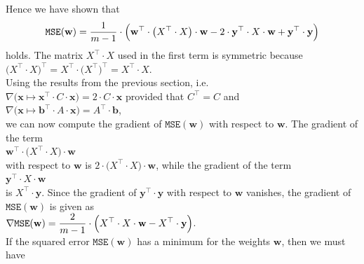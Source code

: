 Hence we have shown that
\begin{equation}
  \label{eq:squared-error-4}
  \mathtt{MSE}(\mathbf{w}) = \displaystyle \frac{1}{m-1} \cdot \Bigl(\mathbf{w}^\top \cdot \bigl(X^\top \cdot X\bigr) \cdot \mathbf{w} 
                                             - 2 \cdot \textbf{y}^\top \cdot X \cdot \mathbf{w} 
                                             + \mathbf{y}^\top \cdot \mathbf{y}
                                        \Bigr)
\end{equation}
holds.  The matrix $X^\top \cdot X$ used in the first term is symmetric because
\\[0.2cm]
\hspace*{1.3cm}
$\bigl(X^\top \cdot X\bigr)^\top = X^\top \cdot \bigl(X^\top\bigr)^\top = X^\top \cdot X$.
\\[0.2cm]
Using the results from the previous section, i.e.~
\\[0.2cm]
\hspace*{1.3cm}
$\nabla \bigl(\mathbf{x} \mapsto \mathbf{x}^\top \cdot C \cdot \mathbf{x}\bigr) = 2 \cdot C \cdot \mathbf{x}$
\quad provided that $C^\top = C$ \quad and
\\[0.2cm]
\hspace*{1.3cm}
$\nabla \bigl(\mathbf{x} \mapsto \mathbf{b}^\top \cdot A \cdot \mathbf{x}\bigr) = A^\top \cdot \mathbf{b}$,
\\[0.2cm]
we can now compute the gradient of $\mathtt{MSE}(\mathbf{w})$ with respect to
$\mathbf{w}$.  The gradient of the term
\\[0.2cm]
\hspace*{1.3cm}
$\mathbf{w}^\top \cdot \bigl(X^\top \cdot X\bigr) \cdot \mathbf{w}$
\\[0.2cm]
with respect to $\mathbf{w}$ is $2 \cdot \bigl(X^\top \cdot X\bigr) \cdot \mathbf{w}$, while the gradient of
the term 
\\[0.2cm]
\hspace*{1.3cm}
$\textbf{y}^\top \cdot X \cdot \mathbf{w}$
\\[0.2cm]
is $X^\top \cdot \mathbf{y}$.  Since the gradient of $\mathbf{y}^\top \cdot \mathbf{y}$ with respect to
$\mathbf{w}$ vanishes, the gradient of $\mathtt{MSE}(\mathbf{w})$ is given as
\\[0.2cm]
\hspace*{1.3cm}
$\displaystyle \nabla \mathtt{MSE}(\mathbf{w}) = \frac{2}{m-1} \cdot \Bigl(X^\top \cdot X \cdot \mathbf{w} - X^\top \cdot \mathbf{y}\Bigr)$.
\\[0.2cm]
If the squared error $\mathtt{MSE}(\mathbf{w})$ has a minimum for the weights $\mathbf{w}$, then we must have

